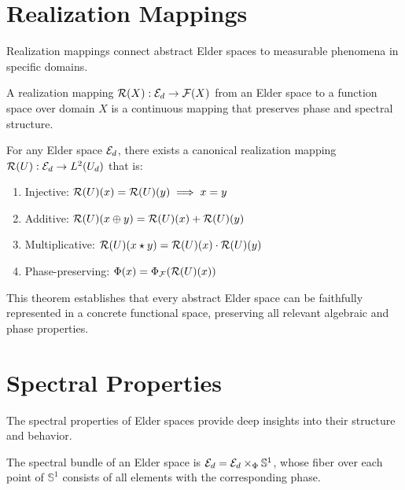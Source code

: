 \section{Realization Mappings}

Realization mappings connect abstract Elder spaces to measurable phenomena in specific domains.

\begin{definition}
A realization mapping $\mathcal{R}(X): \mathcal{E}_{d} \rightarrow \mathcal{F}(X)$ from an Elder space to a function space over domain $X$ is a continuous mapping that preserves phase and spectral structure.
\end{definition}

\begin{theorem}
For any Elder space $\mathcal{E}_{d}$, there exists a canonical realization mapping $\mathcal{R}(U): \mathcal{E}_{d} \rightarrow L^2(U_d)$ that is:
\begin{enumerate}
    \item Injective: $\mathcal{R}(U)(x) = \mathcal{R}(U)(y) \implies x = y$
    \item Additive: $\mathcal{R}(U)(x \oplus y) = \mathcal{R}(U)(x) + \mathcal{R}(U)(y)$
    \item Multiplicative: $\mathcal{R}(U)(x \star y) = \mathcal{R}(U)(x) \cdot \mathcal{R}(U)(y)$
    \item Phase-preserving: $\Phi(x) = \Phi_{\mathcal{F}}(\mathcal{R}(U)(x))$
\end{enumerate}
\end{theorem}

This theorem establishes that every abstract Elder space can be faithfully represented in a concrete functional space, preserving all relevant algebraic and phase properties.

\section{Spectral Properties}

The spectral properties of Elder spaces provide deep insights into their structure and behavior.

\begin{definition}
The spectral bundle of an Elder space is $\mathcal{E}_d = \mathcal{E}_{d} \times_{\Phi} \mathbb{S}^1$, whose fiber over each point of $\mathbb{S}^1$ consists of all elements with the corresponding phase.
\end{definition}

